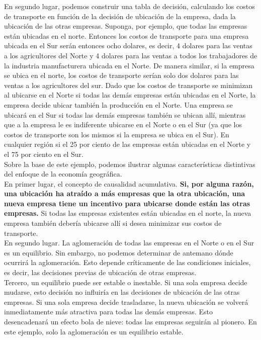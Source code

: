 En segundo lugar, podemos construir una tabla de decisión, calculando los costos de transporte en función de la decisión de ubicación de la empresa, dada la ubicación de las otras empresas. Suponga, por ejemplo, que todas las empresas están ubicadas en el norte. Entonces los costos de transporte para una empresa ubicada en el Sur serán entonces ocho dolares, es decir, 4 dolares para las ventas a los agricultores del Norte y 4 dolares para las ventas a todos los trabajadores de la industria manufacturera ubicada en el Norte. De manera similar, si la empresa se ubica en el norte, los costos de transporte serían solo dos dolares para las ventas a los agricultores del sur. Dado que los costos de transporte se minimizan al ubicarse en el Norte si todas las demás empresas están ubicadas en el Norte, la empresa decide ubicar también la producción en el Norte. Una empresa se ubicará en el Sur si todas las demás empresas también se ubican allí, mientras que a la empresa le es indiferente ubicarse en el Norte o en el Sur (ya que los costos de transporte son los mismos si la empresa se ubica en el Sur). En cualquier región si el 25 por ciento de las empresas están ubicadas en el Norte y el 75 por ciento en el Sur.\\
Sobre la base de este ejemplo, podemos ilustrar algunas características distintivas del enfoque de la economía geográfica.\\
En primer lugar, el concepto de causalidad acumulativa. \textbf{Si, por alguna razón, una ubicación ha atraído a más empresas que la otra ubicación, una nueva empresa tiene un incentivo para ubicarse donde están las otras empresas.} Si todas las empresas existentes están ubicadas en el norte, la nueva empresa también debería ubicarse allí si desea minimizar sus costos de transporte.\\
En segundo lugar. La aglomeración de todas las empresas en el Norte o en el Sur es un equilibrio. Sin embargo, no podemos determinar de antemano dónde ocurrirá la aglomeración. Esto depende críticamente de las condiciones iniciales, es decir, las decisiones previas de ubicación de otras empresas.\\
Tercero, un equilibrio puede ser estable o inestable. Si una sola empresa decide mudarse, esto decisión no influiría en las decisiones de ubicación de las otras empresas. Si una sola empresa decide trasladarse, la nueva ubicación se volverá inmediatamente más atractiva para todas las demás empresas. Esto desencadenará un efecto bola de nieve: todas las empresas seguirán al pionero. En este ejemplo, solo la aglomeración es un equilibrio estable.\\
